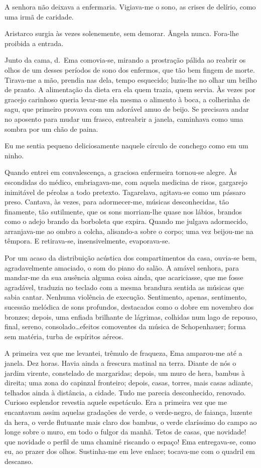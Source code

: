 A senhora não deixava a enfermaria. Vigiava{}-me o sono,
as crises de delírio, como uma irmã de caridade. 

Aristarco surgia às
vezes solenemente, sem demorar. Ângela nunca. Fora{}-lhe proibida a
entrada. 

Junto da cama, d.~Ema comovia{}-se, mirando a prostração
pálida ao reabrir os olhos de um desses períodos de sono dos enfermos,
que tão bem fingem de morte. Tirava{}-me a mão, prendia nas dela, tempo
esquecido; luzia{}-lhe no olhar um brilho de pranto. A alimentação da
dieta era ela quem trazia, quem servia. Às vezes por gracejo carinhoso
queria levar{}-me ela mesma o alimento à boca, a colherinha de sagu,
que primeiro provava com um adorável amuo de beijo. Se precisava andar
no aposento para mudar um frasco, entreabrir a janela, caminhava como
uma sombra por um chão de paina. 

Eu me sentia pequeno deliciosamente
naquele círculo de conchego como em um ninho. 

Quando entrei em
convalescença, a graciosa enfermeira tornou{}-se alegre. Às escondidas
do médico, embriagava{}-me, com aquela medicina de risos, gargarejo
inimitável de pérolas a todo pretexto. Tagarelava, agitava{}-se como um
pássaro preso. Cantava, às vezes, para adormecer{}-me, músicas
desconhecidas, tão finamente, tão sutilmente, que os sons morriam{}-lhe
quase nos lábios, brandos como o adejo brando da borboleta que expira.
Quando me julgava adormecido, arranjava{}-me ao ombro a colcha,
alisando{}-a sobre o corpo; uma vez beijou{}-me na têmpora. E
retirava{}-se, insensivelmente, evaporava{}-se.

Por um acaso da distribuição acústica dos compartimentos da casa,
ouvia{}-se bem, agradavelmente amaciado, o som do piano do salão. A
amável senhora, para mandar{}-me da sua ausência alguma coisa ainda,
que acariciasse, que me fosse agradável, traduzia no teclado com a
mesma brandura sentida as músicas que sabia cantar. Nenhuma violência
de execução. Sentimento, apenas, sentimento, sucessão melódica de sons
profundos, destacados como o dobre em novembro dos bronzes; depois, uma
enfiada brilhante de lágrimas, colhidas num lago de repouso, final,
sereno, consolado\ldots efeitos comoventes da música de Schopenhauer;
forma sem matéria, turba de espíritos aéreos. 

A primeira vez que me
levantei, trêmulo de fraqueza, Ema amparou{}-me até a janela. Dez
horas. Havia ainda a frescura matinal na terra. Diante de nós o jardim
virente, constelado de margaridas; depois, um muro de hera, bambus à
direita; uma zona do capinzal fronteiro; depois, casas, torres, mais
casas adiante, telhados ainda à distância, a cidade. Tudo me parecia
desconhecido, renovado. Curioso esplendor revestia aquele espetáculo.
Era a primeira vez que me encantavam assim aquelas gradações de verde,
o verde{}-negro, de faiança, luzente da hera, o verde flutuante mais
claro dos bambus, o verde claríssimo do campo ao longe sobre o muro, em
todo o fulgor da manhã. Tetos de casas, que novidade! que novidade o
perfil de uma chaminé riscando o espaço! Ema entregava{}-se, como eu,
ao prazer dos olhos. Sustinha{}-me em leve enlace; tocava{}-me com o
quadril em descanso. 

